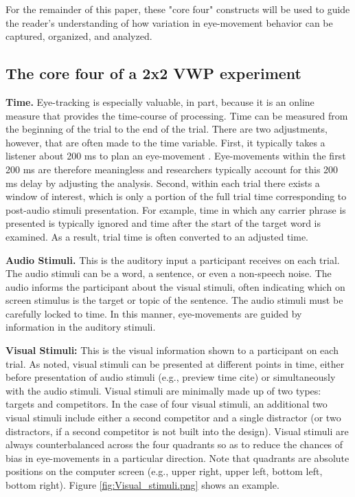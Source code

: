 For the remainder of this paper, these "core four" constructs will be used to guide the reader's understanding of how variation in eye-movement behavior can be captured, organized, and analyzed. 

\subsection{The core four of a 2x2 VWP experiment}

\textbf{Time.} Eye-tracking is especially valuable, in part, because it is an online measure that provides the time-course of processing. Time can be measured from the beginning of the trial to the end of the trial. There are two adjustments, however, that are often made to the time variable. First, it typically takes a listener about 200 ms to plan an eye-movement \parencite[][]{Matin_Shao_Boff_1993}. Eye-movements within the first 200 ms are therefore meaningless and researchers typically account for this 200 ms delay by adjusting the analysis. Second, within each trial there exists a window of interest, which is only a portion of the full trial time corresponding to post-audio stimuli presentation. For example, time in which any carrier phrase is presented is typically ignored and time after the start of the target word is examined. As a result, trial time is often converted to an adjusted time.

\textbf{Audio Stimuli.} This is the auditory input a participant receives on each trial. The audio stimuli can be a word, a sentence, or even a non-speech noise. The audio informs the participant about the visual stimuli, often indicating which on screen stimulus is the target or topic of the sentence. The audio stimuli must be carefully locked to time. In this manner, eye-movements are guided by information in the auditory stimuli.   

\textbf{Visual Stimuli:} This is the visual information shown to a participant on each trial. As noted, visual stimuli can be presented at different points in time, either before presentation of audio stimuli (e.g., preview time cite) or simultaneously with the audio stimuli. Visual stimuli are minimally made up of two types: targets and competitors. In the case of four visual stimuli, an additional two visual stimuli include either a second competitor and a single distractor (or two distractors, if a second competitor is not built into the design). Visual stimuli are always counterbalanced across the four quadrants so as to reduce the chances of bias in eye-movements in a particular direction. Note that quadrants are absolute positions on the computer screen (e.g., upper right, upper left, bottom left, bottom right). Figure \ref{fig:Visual_stimuli.png} shows an example. 

